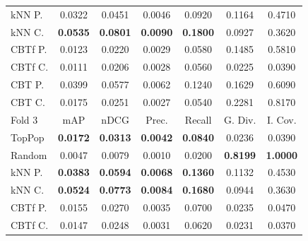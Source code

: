 \begin{table}[hbt]
\begin{tabulary}{\textwidth}{|L|CCCCCC|}
kNN P. & 0.0322 &           0.0451 &           0.0046 &           0.0920 &                                            0.1164 &                                            0.4710 \\
kNN C. & \textbf{0.0535} &  \textbf{0.0801} &  \textbf{0.0090} &  \textbf{0.1800} &                                            0.0927 &                                            0.3620 \\
CBTf P. & 0.0123 &           0.0220 &           0.0029 &           0.0580 &                                            0.1485 &                                            0.5810 \\
CBTf C. & 0.0111 &           0.0206 &           0.0028 &           0.0560 &                                            0.0225 &                                            0.0390 \\
CBT P. & 0.0399 &           0.0577 &           0.0062 &           0.1240 &                                            0.1629 &                                            0.6090 \\
CBT C. & 0.0175 &           0.0251 &           0.0027 &           0.0540 &                                            0.2281 &                                            0.8170 \\
\hline
\hline
Fold 3 & mAP & nDCG & Prec. & Recall & G. Div. & I. Cov. \\
\hline
TopPop & \textbf{0.0172} &  \textbf{0.0313} &  \textbf{0.0042} &  \textbf{0.0840} &                                            0.0236 &                                            0.0390 \\
Random & 0.0047 &           0.0079 &           0.0010 &           0.0200 &                                   \textbf{0.8199} &                                   \textbf{1.0000} \\
kNN P. & \textbf{0.0383} &  \textbf{0.0594} &  \textbf{0.0068} &  \textbf{0.1360} &                                            0.1132 &                                            0.4530 \\
kNN C. & \textbf{0.0524} &  \textbf{0.0773} &  \textbf{0.0084} &  \textbf{0.1680} &                                            0.0944 &                                            0.3630 \\
CBTf P. & 0.0155 &           0.0270 &           0.0035 &           0.0700 &                                            0.0235 &                                            0.0470 \\
CBTf C. & 0.0147 &           0.0248 &           0.0031 &           0.0620 &                                            0.0231 &                                            0.0370 \\

\end{tabulary}
\end{table}
